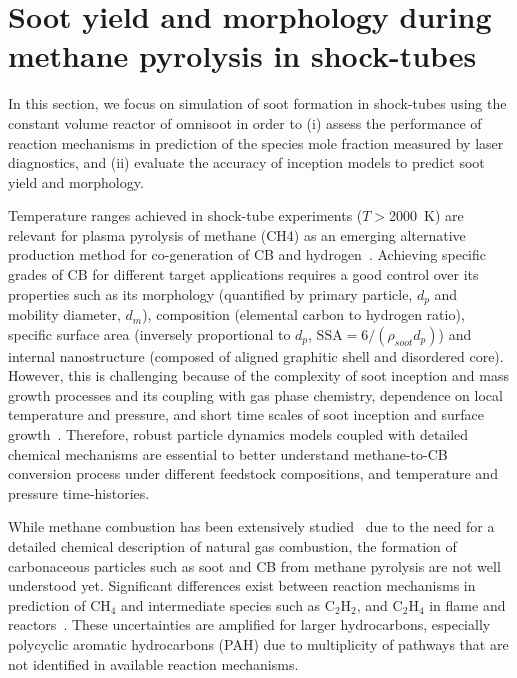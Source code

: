 \section{Soot yield and morphology during methane pyrolysis in shock-tubes}

In this section, we focus on simulation of soot formation in shock-tubes using the constant volume reactor of omnisoot in order to (i) assess the performance of reaction mechanisms in prediction of the species mole fraction measured by laser diagnostics, and (ii) evaluate the accuracy of inception models to predict soot yield and morphology. 

Temperature ranges achieved in shock-tube experiments ($T>$2000~K) are relevant for plasma pyrolysis of methane (CH4) as an emerging alternative production method for co-generation of CB and hydrogen~\citep{fulcheri2023energy}. Achieving specific grades of CB for different target applications requires a good control over its properties such as its morphology (quantified by primary particle, $d_p$ and mobility diameter, $d_m$), composition (elemental carbon to hydrogen ratio), specific surface area (inversely proportional to $d_p$, $\mathrm{SSA}=6/(\rho_{soot}d_p)$) and internal nanostructure (composed of aligned graphitic shell and disordered core). However, this is challenging because of the complexity of soot inception and mass growth processes and its coupling with gas phase chemistry, dependence on local temperature and pressure, and short time scales of soot inception and surface growth~\citep{violi2005relative}. Therefore, robust particle dynamics models coupled with detailed chemical mechanisms are essential to better understand methane-to-CB conversion process under different feedstock compositions, and temperature and pressure time-histories.

While methane combustion has been extensively studied~\citep{wang2013pah} due to the need for a detailed chemical description of natural gas combustion, the formation of carbonaceous particles such as soot and CB from methane pyrolysis are not well understood yet. Significant differences exist between reaction mechanisms in prediction of $\mathrm{CH_4}$ and intermediate species such as $\mathrm{C_2H_2}$, and $\mathrm{C_2H_4}$ in flame and reactors~\citep{wang2013pah}. These uncertainties are amplified for larger hydrocarbons, especially polycyclic aromatic hydrocarbons (PAH) due to multiplicity of pathways that are not identified in available reaction mechanisms.

